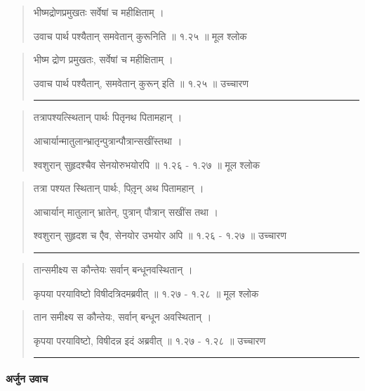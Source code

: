\begin{quotation} 

भीष्मद्रोणप्रमुखतः सर्वेषां च महीक्षिताम्‌  ।  

उवाच पार्थ पश्यैतान्‌ समवेतान्‌ कुरूनिति  ॥ १.२५ ॥  मूल श्लोक
\end{quotation}

\begin{quotation}

भीष्म द्रोण प्रमुखतः, सर्वेषां च महीक्षिताम्  ।  

उवाच पार्थ पश्यैतान्, समवेतान् कुरून् इति  ॥ १.२५ ॥  उच्चारण

\noindent\rule{16cm}{0.4pt} 
\end{quotation}


\begin{quotation} 

तत्रापश्यत्स्थितान्‌ पार्थः पितृनथ पितामहान्‌  ।  

आचार्यान्मातुलान्भ्रातृन्पुत्रान्पौत्रान्सखींस्तथा  ।  

श्वशुरान्‌ सुहृदश्चैव सेनयोरुभयोरपि  ॥ १.२६ - १.२७ ॥  मूल श्लोक
\end{quotation}

\begin{quotation}

तत्रा पश्यत स्थितान् पार्थः, पितृ़न् अथ पितामहान्  ।  

आचार्यान् मातुलान् भ्रातेन्, पुत्रान् पौत्रान् सखींस तथा  । 

श्वशुरान् सुहृदश च एैव, सेनयोर उभयोर अपि  ॥ १.२६ - १.२७ ॥  उच्चारण

\noindent\rule{16cm}{0.4pt} 
\end{quotation}


\begin{quotation} 


तान्समीक्ष्य स कौन्तेयः सर्वान्‌ बन्धूनवस्थितान्‌  ।  
 
कृपया परयाविष्टो विषीदत्रिदमब्रवीत्‌  ॥ १.२७ - १.२८ ॥  मूल श्लोक
\end{quotation}

\begin{quotation}

तान समीक्ष्य स कौन्तेयः, सर्वान् बन्धून अवस्थितान्  ।  

कृपया परयाविष्टो, विषीदन्न इदं अब्रवीत्  ॥ १.२७ - १.२८ ॥  उच्चारण

\noindent\rule{16cm}{0.4pt} 
\end{quotation}

\paragraph{\sanskrit अर्जुन उवाच}

